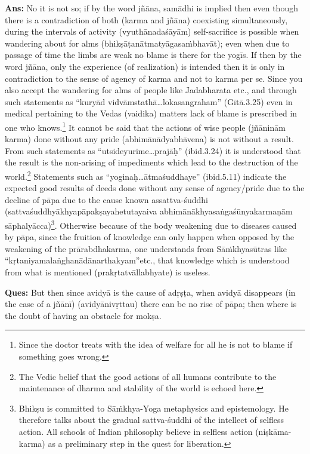 \textbf{Ans:} No it is not so; if by the word jñāna, samādhi is implied then even though there is a contradiction of both (karma and jñāna) coexisting simultaneously, during the intervals of activity (vyuthānadaśāyām) self-sacrifice is possible when wandering about for alms (bhikṣāṭanātmatyāgasaṁbhavāt); even when due to passage of time the limbs are weak no blame is there for the yogīs. If then by the word jñāna, only the experience (of realization) is intended then it is only in contradiction to the sense of agency of karma and not to karma per se. Since you also accept the wandering for alms of people like Jadabharata etc., and through such statements as “kuryād vidvāmstathā…lokasangraham” (Gītā.3.25) even in medical pertaining to the Vedas (vaidika) matters lack of blame is prescribed in one who knows.\footnote{Since the doctor treats with the idea of welfare for all he is not to blame if something goes wrong.}  It cannot be said that the actions of wise people (jñāninām karma) done without any pride (abhimānādyabhāvena) is not without a result. From such statements as “utsideyurime…prajāḥ” (ibid.3.24) it is understood that the result is the non-arising of impediments which lead to the destruction of the world.\footnote{The Vedic belief that the good actions of all humans contribute to the maintenance of dharma and stability
of the world is echoed here.} Statements such as “yoginaḥ…ātmaśuddhaye” (ibid.5.11) indicate the expected good results of deeds done without any sense of agency/pride due to the decline of pāpa due to the cause known as\break sattva-śuddhi (sattvaśuddhyākhyapāpakṣayahetutayaiva abhimānā\-khyasaṅgaśūnyakarmaṇām sāphalyācca)\footnote{Bhikṣu is committed to Sāṁkhya-Yoga metaphysics and epistemology. He therefore talks about the gradual
sattva-śuddhi of the intellect of selfless action. All schools of Indian philosophy believe in selfless action
(niṣkāma-karma) as a preliminary step in the quest for liberation.}. Otherwise because of the body weakening due to diseases caused by pāpa, since the fruition of knowledge can only happen when opposed by the weakening of the prārabdhakarma, one understands from Sāṁkhyasūtras like “kṛtaniyamalaṅghanādānarthakyam”etc., that knowledge which is understood from what is mentioned (prakṛtatvāllabhyate) is useless.

\textbf{Ques:} But then since avidyā is the cause of adṛṣṭa, when avidyā disappears (in the case of a jñānī) (avidyānivṛttau) there can be no rise of pāpa; then where is the doubt of having an obstacle for mokṣa.

